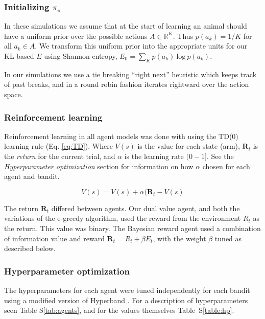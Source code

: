 \subsubsection*{Initializing $\pi_\pi$}
In these simulations we assume that at the start of learning an animal should have a uniform prior over the possible actions $A \in \mathbb{R}^K$. Thus $p(a_k) = 1/K$ for all $a_k \in A$. We transform this uniform prior into the appropriate units for our KL-based $E$ using Shannon entropy, $E_0 = \sum_K p(a_k)\ \text{log}\ p(a_k)$. 

In our simulations we use a tie breaking ``right next'' heuristic which keeps track of past breaks, and in a round robin fashion iterates rightward over the action space.

\subsubsection*{Reinforcement learning} Reinforcement learning in all agent models was done with using the TD(0) learning rule \cite{Sutton2018} (Eq. \ref{eq:TD}). Where $V(s)$ is the value for each state (arm), $\mathbf{R}_t$ is the \emph{return} for the current trial, and $\alpha$ is the learning rate $(0-1]$. See the \emph{Hyperparameter optimization} section for information on how $\alpha$ chosen for each agent and bandit.

\begin{equation}
	\label{eq:TD}
	V(s) = V(s) + \alpha (\mathbf{R}_t - V(s)
\end{equation}

The return $\mathbf{R}_t$ differed between agents. Our dual value agent, and both the variations of the e-greedy algorithm, used the reward from the environment $R_t$ as the return. This value was binary. The Bayesian reward agent used a combination of information value and reward $\mathbf{R}_t = R_t + \beta E_t$, with the weight $\beta$ tuned as described below. 

\subsubsection*{Hyperparameter optimization}
The hyperparameters for each agent were tuned independently for each bandit using a modified version of Hyperband \cite{Li2016a}. For a description of hyperparameters seen Table S\ref{tab:agents}, and for the values themselves Table~S\ref{table:hp}.

